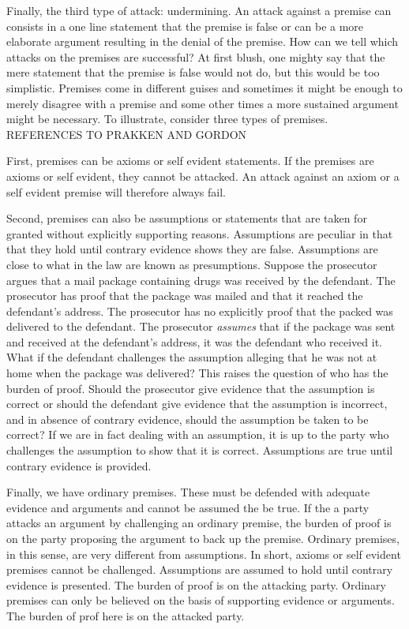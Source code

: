 \documentclass[10pt]{article}
\begin{document}
Finally, the third type of attack: undermining. An attack against a premise can consists in a one line statement that the premise is false or can be a more elaborate argument resulting in the denial of the premise. How can we tell which attacks on the premises are successful? At first blush, one mighty say that the mere statement that the premise is false would not do, but this would be too simplistic.  Premises come in different guises and sometimes it might be enough to merely disagree with a premise and some other times a more sustained argument might be necessary. To illustrate, consider three types of premises. REFERENCES TO PRAKKEN AND GORDON

First, premises can be axioms or self evident statements. If the premises are axioms or self evident, they cannot be attacked. An attack against an axiom or a self evident premise will therefore always fail. 

Second, premises can also be assumptions or statements that are taken for granted without explicitly supporting reasons. Assumptions are peculiar in that that they hold until contrary evidence shows they are false. Assumptions are close to what in the law are known as presumptions. Suppose the prosecutor argues that a mail package containing drugs was received by the defendant. The prosecutor has proof that the package was mailed and that it reached the defendant's address. The prosecutor has no explicitly proof that the packed was delivered to the defendant. The prosecutor \textit{assumes} that if the package was sent and received at the defendant's address, it was the defendant who received it. What if the defendant challenges the assumption alleging that he was not at home when the package was delivered? This raises the question of who has the burden of proof. Should the prosecutor give evidence that the assumption is correct or should the defendant give evidence that the assumption is incorrect, and in absence of contrary evidence, should the assumption be taken to be correct? 
If we are in fact dealing with an assumption, it is up to the party who challenges the assumption to show that it is correct. Assumptions are true until contrary evidence is provided. 

Finally, we have ordinary premises. These must be defended with adequate evidence and arguments and cannot be assumed the be true. If the a party attacks an argument by challenging an ordinary premise, the burden of proof is on the party proposing the argument to back up the premise. Ordinary premises, in this sense, are very different from assumptions. In short, axioms or self evident premises cannot be challenged. Assumptions are assumed to hold until contrary evidence is presented. The burden of proof is on the attacking party. Ordinary premises can only be believed on the basis of supporting evidence or arguments. The burden of prof here is on the attacked party. 
\end{document}
